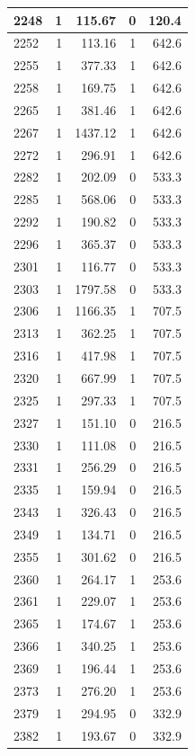 \documentclass[
  12pt,
]{book}
\begin{document}
\begin{tabular}{l|r|r|r|r}
\hline
2248 & 1 & 115.67 & 0 & 120.4\\
\hline
2252 & 1 & 113.16 & 1 & 642.6\\
\hline
2255 & 1 & 377.33 & 1 & 642.6\\
\hline
2258 & 1 & 169.75 & 1 & 642.6\\
\hline
2265 & 1 & 381.46 & 1 & 642.6\\
\hline
2267 & 1 & 1437.12 & 1 & 642.6\\
\hline
2272 & 1 & 296.91 & 1 & 642.6\\
\hline
2282 & 1 & 202.09 & 0 & 533.3\\
\hline
2285 & 1 & 568.06 & 0 & 533.3\\
\hline
2292 & 1 & 190.82 & 0 & 533.3\\
\hline
2296 & 1 & 365.37 & 0 & 533.3\\
\hline
2301 & 1 & 116.77 & 0 & 533.3\\
\hline
2303 & 1 & 1797.58 & 0 & 533.3\\
\hline
2306 & 1 & 1166.35 & 1 & 707.5\\
\hline
2313 & 1 & 362.25 & 1 & 707.5\\
\hline
2316 & 1 & 417.98 & 1 & 707.5\\
\hline
2320 & 1 & 667.99 & 1 & 707.5\\
\hline
2325 & 1 & 297.33 & 1 & 707.5\\
\hline
2327 & 1 & 151.10 & 0 & 216.5\\
\hline
2330 & 1 & 111.08 & 0 & 216.5\\
\hline
2331 & 1 & 256.29 & 0 & 216.5\\
\hline
2335 & 1 & 159.94 & 0 & 216.5\\
\hline
2343 & 1 & 326.43 & 0 & 216.5\\
\hline
2349 & 1 & 134.71 & 0 & 216.5\\
\hline
2355 & 1 & 301.62 & 0 & 216.5\\
\hline
2360 & 1 & 264.17 & 1 & 253.6\\
\hline
2361 & 1 & 229.07 & 1 & 253.6\\
\hline
2365 & 1 & 174.67 & 1 & 253.6\\
\hline
2366 & 1 & 340.25 & 1 & 253.6\\
\hline
2369 & 1 & 196.44 & 1 & 253.6\\
\hline
2373 & 1 & 276.20 & 1 & 253.6\\
\hline
2379 & 1 & 294.95 & 0 & 332.9\\
\hline
2382 & 1 & 193.67 & 0 & 332.9\\

\end{tabular}
\end{document}
